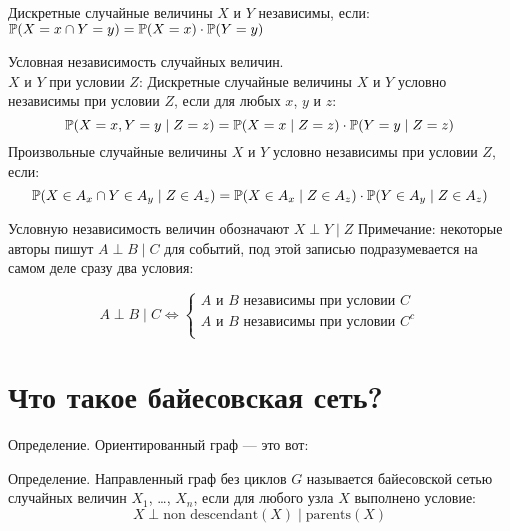 Дискретные случайные величины $X$ и $Y$ независимы, если: 
$\P(X=x \cap Y=y)=\P(X=x)\cdot\P(Y=y)$

Условная независимость случайных величин.\\ $X$ и $Y$ при условии $Z$:
Дискретные случайные величины $X$ и $Y$ условно независимы при условии $Z$, если для любых $x$, $y$ и $z$:
\begin{equation}
\P(X=x,Y=y \mid Z=z) = \P(X=x \mid Z=z)\cdot \P(Y=y \mid Z=z)
\end{equation}
Произвольные случайные величины $X$ и $Y$ условно независимы при условии $Z$, если:
\begin{equation}
\P(X \in A_x \cap Y \in  A_y\mid Z \in A_z) = \P(X \in A_x \mid Z \in A_z)\cdot \P(Y \in A_y\mid Z \in A_z)
\end{equation}

Условную независимость величин обозначают $X \perp Y \mid Z$
Примечание: некоторые авторы пишут $A \perp B \mid C$ для событий, под этой записью подразумевается на самом деле сразу два условия:

\begin{equation}
A \perp B \mid C \Leftrightarrow 
\begin{cases}
A \mbox{ и } B \mbox{ независимы при условии } C \\
A \mbox{ и } B \mbox{ независимы при условии } C^c \\
\end{cases}
\end{equation}

\section{Что такое байесовская сеть?}

Определение. Ориентированный граф --- это вот:

Определение. Направленный граф без циклов $G$ называется байесовской сетью случайных величин $X_1$, \ldots, $X_n$, если для любого узла $X$ выполнено условие:
\begin{equation}
X \perp \mbox{non descendant}(X) \mid \mbox{parents}(X)
\end{equation}


